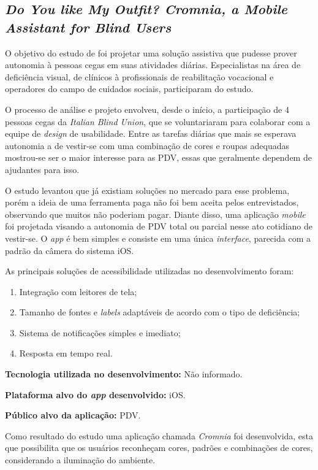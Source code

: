 \subsection{\emph{Do You like My Outfit? Cromnia, a Mobile Assistant for Blind Users}}

O objetivo do estudo de  foi projetar uma solução assistiva que pudesse prover autonomia à pessoas cegas em suas atividades diárias.
Especialistas na área de deficiência visual, de clínicos à profissionais de reabilitação vocacional e operadores do campo de cuidados sociais, participaram do estudo.

O processo de análise e projeto envolveu, desde o início, a participação de 4 pessoas cegas da \emph{Italian Blind Union}, que se voluntariaram para colaborar com a equipe de \emph{design} de usabilidade.
Entre as tarefas diárias que mais se esperava autonomia a de vestir-se com uma combinação de cores e roupas adequadas mostrou-se ser o maior interesse para as PDV, essas que geralmente dependem de ajudantes para isso.

O estudo levantou que já existiam soluções no mercado para esse problema, porém a ideia de uma ferramenta paga não foi bem aceita
pelos entrevistados, observando que muitos não poderiam pagar.
Diante disso, uma aplicação \emph{mobile} foi projetada visando a autonomia de PDV total ou parcial nesse ato cotidiano de vestir-se.
O \emph{app} é bem simples e consiste em uma única \emph{interface}, parecida com a padrão da câmera do sistema iOS\@.

As principais soluções de acessibilidade utilizadas no desenvolvimento foram: 

\begin{enumerate}
    \item Integração com leitores de tela;
    \item Tamanho de fontes e \emph{labels} adaptáveis de acordo com o tipo de deficiência;
    \item Sistema de notificações simples e imediato;
    \item Resposta em tempo real.
\end{enumerate}

\textbf{Tecnologia utilizada no desenvolvimento:} Não informado.

\textbf{Plataforma alvo do \emph{app} desenvolvido:} iOS.

\textbf{Público alvo da aplicação:} PDV\@.

Como resultado do estudo uma aplicação chamada \emph{Cromnia} foi desenvolvida, esta que possibilita que os usuários reconheçam
cores, padrões e combinações de cores, considerando a iluminação do ambiente.

